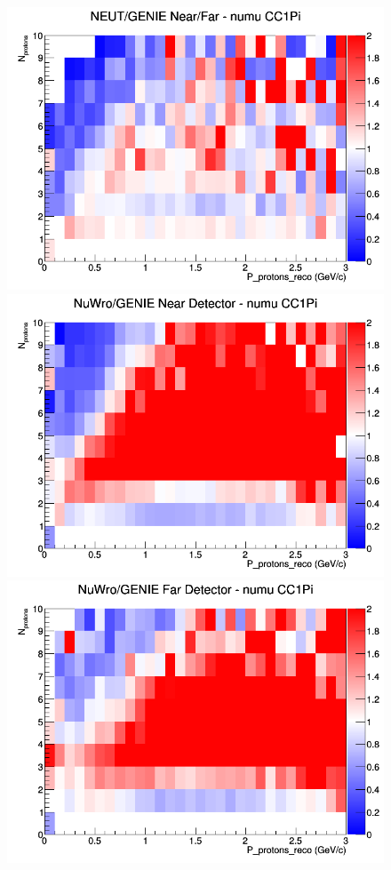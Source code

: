 \documentclass[12pt]{article}
\begin{document}
\begin{figure}[h]
\endminipage
{}
\includegraphics[width=\linewidth]{eff_N_P/GAr/protons/ratios/CC1Pi_NEUT_GENIE_numu_NF_N_P.png}
\endminipage
\newline
{}
\includegraphics[width=\linewidth]{eff_N_P/GAr/protons/ratios/CC1Pi_NuWro_GENIE_numu_near_N_P.png}
\endminipage
{}
\includegraphics[width=\linewidth]{eff_N_P/GAr/protons/ratios/CC1Pi_NuWro_GENIE_numu_far_N_P.png}

\end{figure}
\end{document}
